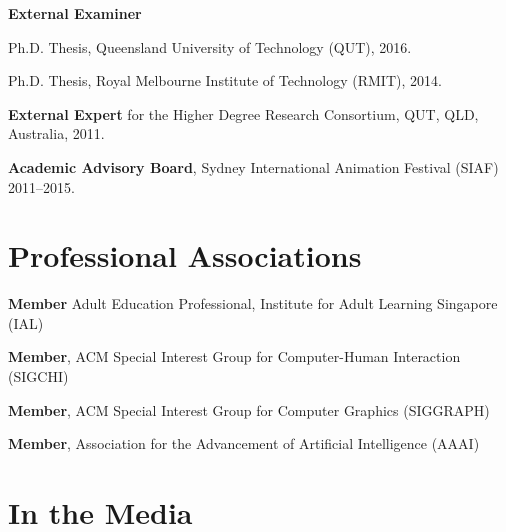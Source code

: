 \documentclass[10pt,a4paper]{article}
\renewenvironment{itemize}{
    \begin{list}{}{
            \setlength{\leftmargin}{1.5em}
            \setlength{\itemsep}{0.25em}
            \setlength{\parskip}{0pt}
            \setlength{\parsep}{0.25em}
        }
        }{
    \end{list}
}
\begin{document}
\begin{itemize}
    \item \textbf{External Examiner}
        \begin{itemize}
            \item Ph.D. Thesis, Queensland University of Technology (QUT), 2016.
            \item Ph.D. Thesis, Royal Melbourne Institute of Technology (RMIT), 2014.
        \end{itemize}

    \item \textbf{External Expert} for the Higher Degree Research Consortium, QUT, QLD, Australia, 2011. %

    \item \textbf{Academic Advisory Board}, Sydney International Animation Festival (SIAF) 2011--2015.

\end{itemize}



\section*{Professional Associations}

\begin{itemize}

    \item \textbf{Member} Adult Education Professional, Institute for Adult Learning Singapore (IAL)

    \item \textbf{Member}, ACM Special Interest Group for Computer-Human Interaction (SIGCHI)

    \item \textbf{Member}, ACM Special Interest Group for Computer Graphics (SIGGRAPH)

    \item \textbf{Member}, Association for the Advancement of Artificial Intelligence (AAAI)

\end{itemize}



\section*{In the Media}
\end{document}
